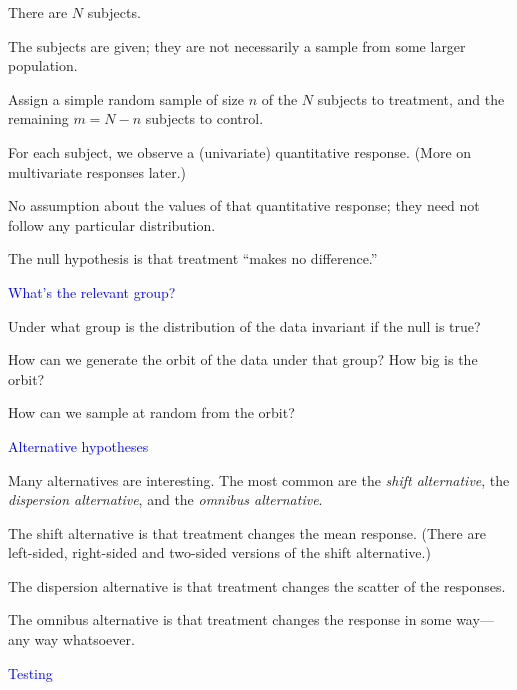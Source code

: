 \documentclass[landscape]{slides}
\begin{document}
\begin{slide}
\begin{slide}
   There are $N$ subjects.
   
   The subjects are given; they are not necessarily a sample from some larger population.
    
    Assign a simple random sample of size $n$ of the $N$ subjects to treatment,
    and the remaining $m = N - n$ subjects to control.
    
    For each subject, we observe a (univariate) quantitative response. (More on multivariate
    responses later.)
    
    No assumption about the values of that quantitative response;
    they need not follow any particular distribution.
    
    The null hypothesis is that treatment ``makes no difference.''
\end{slide}

\begin{slide}
{\textcolor{blue}{What's the relevant group?}}

Under what group is the distribution of the data invariant if the null is true?

How can we generate the orbit of the data under that group?  How big is the orbit?

How can we sample at random from the orbit?

\end{slide}

\begin{slide}
{\textcolor{blue}{Alternative hypotheses}}

    Many alternatives are interesting.
    The most common are the {\em shift alternative\/}, the {\em dispersion alternative\/}, 
    and the {\em omnibus alternative\/}.
    
    The shift alternative is that treatment changes the mean response.
    (There are left-sided, right-sided and two-sided versions of the shift alternative.)
    
    The dispersion alternative is that treatment changes the scatter of the responses.
    
    The omnibus alternative is that treatment changes the response in some
    way---any way whatsoever.
    
\end{slide}

\begin{slide}
{\textcolor{blue}{Testing}}


\end{slide}
\end{slide}
\end{document}
